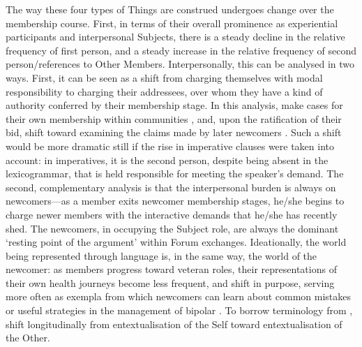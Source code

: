 The way these four types of Things are construed undergoes change over the membership course. First, in terms of their overall prominence as experiential participants and interpersonal Subjects, there is a steady decline in the relative frequency of first person, and a steady increase in the relative frequency of second person\slash references to Other Members. Interpersonally, this can be analysed in two ways. First, it can be seen as a shift from  charging themselves with modal responsibility to charging their addressees, over whom they have a kind of authority conferred by their membership stage. In this analysis,  make cases for their own membership within communities \cite{stommel_use_2011,vayreda_social_2009}, and, upon the ratification of their bid, shift toward examining the claims made by later newcomers \cite{paulus_`please_2015}. Such a shift would be more dramatic still if the rise in imperative clauses were taken into account: in imperatives, it is the second person, despite being absent in the \gls{lexicogrammar}, that is held responsible for meeting the speaker's demand. The second, complementary analysis is that the interpersonal burden is always on newcomers---as a \gls{member} exits newcomer membership stages, he\slash she begins to charge newer \glspl{member} with the interactive demands that he\slash she has recently shed. The newcomers, in occupying the Subject role, are always the dominant `resting point of the argument' \cite[p.~118]{halliday_introduction_2004} within \gls{Forum} exchanges. Ideationally, the world being represented through language is, in the same way, the world of the newcomer: as \glspl{member} progress toward veteran roles, their representations of their own health journeys become less frequent, and shift in purpose, serving more often as exempla from which newcomers can learn about common mistakes or useful strategies in the management of \gls{bipolar} \cite{pfeil_social_2011}. To borrow terminology from \textcite{bauman1990poetics},  shift longitudinally from entextualisation of the Self toward entextualisation of the Other. 

